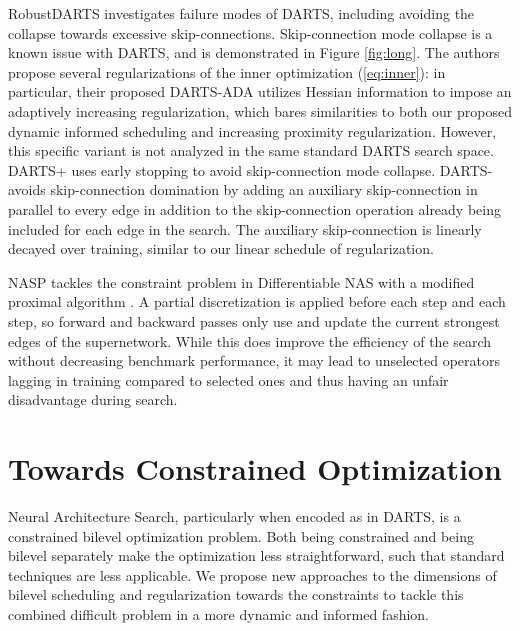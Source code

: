 \documentclass[letterpaper]{article} \usepackage{aaai22}  \usepackage{times}  \usepackage{helvet}  \usepackage{courier}  \usepackage[hyphens]{url}  \usepackage{graphicx} \urlstyle{rm} \def\UrlFont{\rm}  \usepackage{natbib}  \usepackage{caption} \DeclareCaptionStyle{ruled}{labelfont=normalfont,labelsep=colon,strut=off} \frenchspacing  \setlength{\pdfpagewidth}{8.5in}  \setlength{\pdfpageheight}{11in}  \usepackage{algorithm}
\begin{document}
RobustDARTS \cite{zela2020understanding} investigates failure modes of DARTS, including avoiding the collapse towards excessive skip-connections. Skip-connection mode collapse is a known issue with DARTS, and is demonstrated in Figure \ref{fig:long}. The authors propose several regularizations of the inner optimization (\ref{eq:inner}): in particular, their proposed DARTS-ADA utilizes Hessian information to impose an adaptively increasing regularization, which bares similarities to both our proposed dynamic informed scheduling and increasing proximity regularization. However, this specific variant is not analyzed in the same standard DARTS search space. DARTS+ \cite{liang2019darts+} uses early stopping to avoid skip-connection mode collapse. DARTS- \cite{chu2020darts} avoids skip-connection domination by adding an auxiliary skip-connection in parallel to every edge in addition to the skip-connection operation already being included for each edge in the search. The auxiliary skip-connection is linearly decayed over training, similar to our linear schedule of regularization.

NASP \cite{yao2020efficient} tackles the constraint problem in Differentiable NAS with a modified proximal algorithm \cite{parikh2014proximal}. A partial discretization is applied before each  step and each  step, so forward and backward passes only use and update the current strongest edges of the supernetwork. While this does improve the efficiency of the search without decreasing benchmark performance, it may lead to unselected operators lagging in training compared to selected ones and thus having an unfair disadvantage during search. 



\section{Towards Constrained Optimization}
Neural Architecture Search, particularly when encoded as in DARTS, is a constrained bilevel optimization problem. Both being constrained and being bilevel separately make the optimization less straightforward, such that standard techniques are less applicable. We propose new approaches to the dimensions of bilevel scheduling and regularization towards the constraints to tackle this combined difficult problem in a more dynamic and informed fashion.
\end{document}

